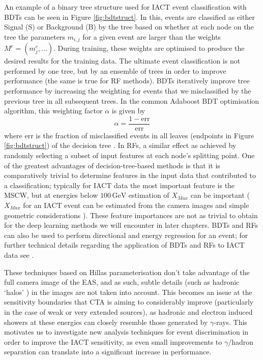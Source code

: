 An example of a binary tree structure used for IACT event classification with BDTs can be seen in Figure \ref{fig:bdtstruct}. In this, events are classified as either Signal (S) or Background (B) by the tree based on whether at each node on the tree the parameters $m_{i,j}$ for a given event are larger than the weights $M^c=(m^c_j,...)$. During training, these weights are optimised to produce the desired results for the training data. The ultimate event classification is not performed by one tree, but by an ensemble of trees in order to improve performance (the same is true for RF methods). BDTs iteratively improve tree performance by increasing the weighting for events that we misclassified by the previous tree in all subsequent trees. In the common Adaboost BDT optimisation algorithm, this weighting factor $\alpha$ is given by 
\begin{equation}
    \alpha=\frac{1-\mathrm{err}}{\mathrm{err}}
\end{equation}
where $\mathrm{err}$ is the fraction of misclassified events in all leaves (endpoints in Figure \ref{fig:bdtstruct}) of the decision tree \cite{hessbdt}. In RFs, a similar effect as achieved by randomly selecting a subset of input features at each node’s splitting point. One of the greatest advantages of decision-tree-based methods is that it is comparatively trivial to determine features in the input data that contributed to a classification; typically for IACT data the most important feature is the MSCW, but at energies below $\mathrm{100\,GeV}$ estimation of $X_{Max}$ can be important \cite{hessbdt} ($X_{Max}$ for an IACT event can be estimated from the camera images and simple geometric considerations \cite{Sitarek1i}). These feature importances are not as trivial to obtain for the deep learning methods we will encounter in later chapters. BDTs and RFs can also be used to perform directional and energy regression for an event; for further technical details regarding the application of BDTs and RFs to IACT data see \cite{Sitarek1i} \cite{magictime} \cite{hessbdt} \cite{supermagictime}.

These techniques based on Hillas parameterisation don't take advantage of the full camera image of the EAS, and as such, subtle details (such as hadronic `halos' \cite{model++}) in the images are not taken into account. This becomes an issue at the sensitivity boundaries that CTA is aiming to considerably improve (particularly in the case of weak or very extended sources), as hadronic and electron induced showers at these energies can closely resemble those generated by $\gamma$-rays. This motivates us to investigate new analysis techniques for event discrimination in order to improve the IACT sensitivity, as even small improvements to $\gamma$/hadron separation can translate into a significant increase in performance.

